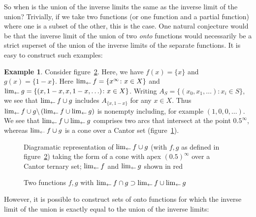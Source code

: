 \documentclass{article}
\theoremstyle{definition}
\newtheorem{exam}[thm]{Example}
\begin{document}
So when is the union of the inverse limits the same as the inverse
limit of the union?  Trivially, if we take two functions (or one
function and a partial function) where one is a subset of the other,
this is the case.  One natural conjecture would be that the inverse
limit of the union of two {\em onto} functions would necessarily be a
strict superset of the union of the inverse limits of the separate
functions.  It is easy to construct such examples:

\begin{exam}
Consider figure~\ref{strictsuperset}.  Here, we have $f(x)=\lbrace
x\rbrace$ and $g(x)=\lbrace 1-x\rbrace$.  Here $\lim_{\leftarrow} f=\lbrace
x^\infty\colon x\in X\rbrace$ and $\lim_{\leftarrow} g = \lbrace (x, 1-x, x,
1-x, \ldots)\colon x\in X\rbrace$.  Writing
$A_S=\lbrace(x_0,x_1,\ldots)\colon x_i\in S\rbrace$, we see that
$\lim_{\leftarrow} f\cup g$ includes $A_{\lbrace x,1-x\rbrace}$ for any $x\in
X$. Thus $\lim_{\leftarrow} f\cup
  g\backslash\left(\lim_{\leftarrow} f\cup\lim_{\leftarrow} g\right)$ is nonempty
including, for example $(1,0,0,\ldots)$.  We see that
$\lim_{\leftarrow} f\cup\lim_{\leftarrow} g$ comprises two arcs that intersect at the
point $0.5^\infty$, whereas $\lim_{\leftarrow} f \cup g$ is a cone over a
Cantor set (figure~\ref{cantorfan}).
\end{exam}

\begin{figure}[h]
\caption{Diagramatic representation of\label{cantorfan} $\lim_{\leftarrow} f\cup
    g$ (with $f,g$ as defined in figure~\ref{strictsuperset}) taking
  the form of a cone with apex $(0.5)^\infty$ over a Cantor ternary
  set; $\lim_{\leftarrow} f$ and $\lim_{\leftarrow} g$ shown in red}
\end{figure}

\begin{figure}[h]
\caption{Two \label{strictsuperset} functions $f,g$ with
  $\lim_{\leftarrow} f\cap g\supset\lim_{\leftarrow} f\cup\lim_{\leftarrow} g$}
\end{figure}

However, it is possible to construct sets of onto functions for which
the inverse limit of the union is exactly equal to the union of the
inverse limits:

\newcommand{\ft}[1]{\tilde{f}_{#1}}
\end{document}
